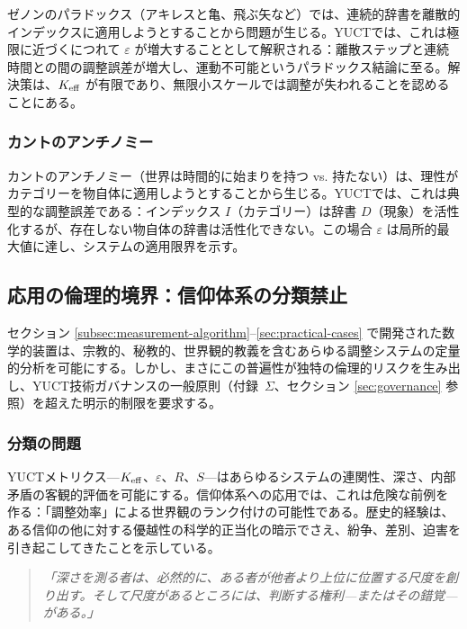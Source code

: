 \documentclass[11pt,a4paper]{article}
\newcommand{\eps}{\varepsilon}
\begin{document}
	ゼノンのパラドックス（アキレスと亀、飛ぶ矢など）では、連続的辞書を離散的インデックスに適用しようとすることから問題が生じる。YUCTでは、これは極限に近づくにつれて \(\eps\) が増大することとして解釈される：離散ステップと連続時間との間の調整誤差が増大し、運動不可能というパラドックス結論に至る。解決策は、\(\Keff\) が有限であり、無限小スケールでは調整が失われることを認めることにある。
	
	\subsubsection{カントのアンチノミー}
	
	カントのアンチノミー（世界は時間的に始まりを持つ vs. 持たない）は、理性がカテゴリーを物自体に適用しようとすることから生じる。YUCTでは、これは典型的な調整誤差である：インデックス \(I\)（カテゴリー）は辞書 \(D\)（現象）を活性化するが、存在しない物自体の辞書は活性化できない。この場合 \(\eps\) は局所的最大値に達し、システムの適用限界を示す。
	
	\subsection{応用の倫理的境界：信仰体系の分類禁止}
	\label{subsec:belief-classification}
	
	セクション \ref{subsec:measurement-algorithm}–\ref{sec:practical-cases} で開発された数学的装置は、宗教的、秘教的、世界観的教義を含むあらゆる調整システムの定量的分析を可能にする。しかし、まさにこの普遍性が独特の倫理的リスクを生み出し、YUCT技術ガバナンスの一般原則（付録~$\Sigma$、セクション \ref{sec:governance} 参照）を超えた明示的制限を要求する。
	
	\subsubsection{分類の問題}
	
	YUCTメトリクス—$\Keff$、$\eps$、$R$、$S$—はあらゆるシステムの連関性、深さ、内部矛盾の客観的評価を可能にする。信仰体系への応用では、これは危険な前例を作る：「調整効率」による世界観のランク付けの可能性である。歴史的経験は、ある信仰の他に対する優越性の科学的正当化の暗示でさえ、紛争、差別、迫害を引き起こしてきたことを示している。
	
	\begin{quote}
		\itshape
		「深さを測る者は、必然的に、ある者が他者より上位に位置する尺度を創り出す。そして尺度があるところには、判断する権利—またはその錯覚—がある。」
	\end{quote}
	
\end{document}
